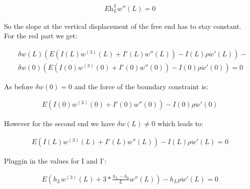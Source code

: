 \begin{equation}
    \begin{split}
        E\text{h}_L^3w''(L) = 0
    \end{split}
\end{equation}

So the slope at the vertical displacement of the free end has to stay constant.\\
\vspace{5mm}
\noindent For the red part we get:

\begin{equation}
    \begin{split}
        &\delta w(L) \left(E\left(I(L)w^{(3)}(L) + I'(L)w''(L)\right) - I(L)\rho \ddot w'(L)\right) - \\
        &\delta w(0) \left(E\left(I(0)w^{(3)}(0) + I'(0)w''(0)\right) - I(0)\rho \ddot w'(0)\right) = 0
    \end{split}
\end{equation}

As before $\delta w(0) = 0$ and the force of the boundary constraint is:

\begin{equation}
    \begin{split}
        E\left(I(0)w^{(3)}(0) + I'(0)w''(0)\right) - I(0)\rho \ddot w'(0)
    \end{split}
\end{equation}

However for the second end we have $\delta w(L) \neq 0$ which leads to:

\begin{equation}
    \begin{split}
        E\left(I(L)w^{(3)}(L) + I'(L)w''(L)\right) - I(L)\rho \ddot w'(L) = 0
    \end{split}
\end{equation}

Pluggin in the values for I and I':

\begin{equation}
    \begin{split}
        E\left(h_Lw^{(3)}(L) + 3*\frac{h_L - h_0}{L}w''(L)\right) - h_L\rho \ddot w'(L) = 0
    \end{split}
\end{equation}






